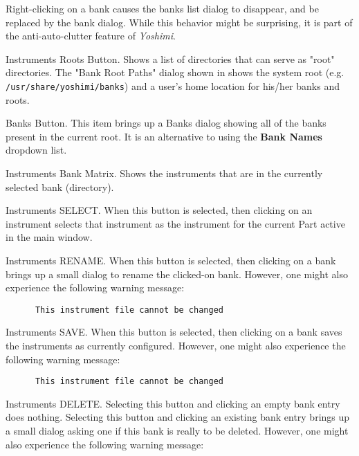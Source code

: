    Right-clicking on a bank causes the banks list dialog
   to disappear, and be replaced by the bank dialog.  While this
   behavior might be surprising, it is part of the anti-auto-clutter feature
   of \textsl{Yoshimi}.

   Instruments Roots Button.
   Shows a list of directories that can serve as "root" directories.
   The "Bank Root Paths" dialog shown in
    shows
   the system root (e.g. \texttt{/usr/share/yoshimi/banks}) and
   a user's home location for his/her banks and roots.

   Banks Button.
   This item brings up a Banks dialog showing all of the banks present in the
   current root.
   It is an alternative to using the \textbf{Bank Names} dropdown list.

   Instruments Bank Matrix.
   Shows the instruments that are in the currently selected bank
   (directory).

   Instruments SELECT.
   When this button is selected, then clicking on an instrument selects that
   instrument as the instrument for the current Part active in the main
   window.

   Instruments RENAME.
   When this button is selected, then clicking on a bank brings
   up a small dialog to rename the clicked-on bank.
   However, one might also experience the following warning message:

   \begin{verbatim}
      This instrument file cannot be changed
   \end{verbatim}

   Instruments SAVE.
   When this button is selected, then clicking on a bank saves
   the instruments as currently configured.
   However, one might also experience the following warning message:

   \begin{verbatim}
      This instrument file cannot be changed
   \end{verbatim}

   Instruments DELETE.
   Selecting this button and clicking an empty bank entry does nothing.
   Selecting this button and clicking an existing bank entry brings up a
   small dialog asking one if this bank is really to be deleted.
   However, one might also experience the following warning message:

